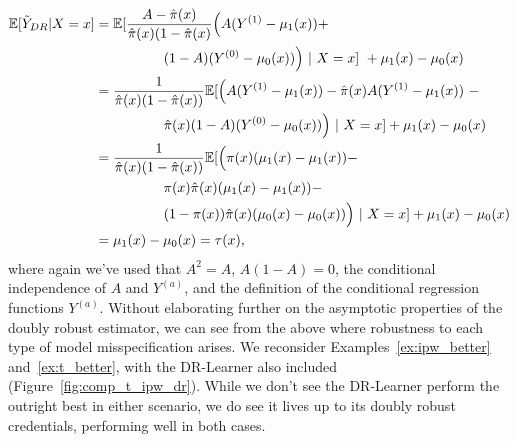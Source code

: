 \documentclass[../thesis.tex]{subfiles}
\begin{document}
\begin{align*}
    \bbE[\Tilde{Y}_{DR} | X = x] & = \bbE [\frac{A - \pihat(x)}{\pihat(x)(1 - \pihat(x)} \Big( A (Y^{(1)} - \mu_1(x)) + \\
    &\hspace{50pt} (1-A)(Y^{(0)} - \mu_0(x)) \Big) \ | \ X=x] \ +  \mu_1(x) - \mu_0(x)  \\
    & = \frac{1}{\pihat(x)(1-\pihat(x))} \bbE [ \Big( A(Y^{(1)} - \mu_1(x)) -\pihat(x)A(Y^{(1)} - \mu_1(x)) \ - \\
    & \hspace{50pt} \pihat(x) (1-A)(Y^{(0)} - \mu_0(x))\Big) \ | \ X=x] + \mu_1(x) - \mu_0(x) \\
    & = \frac{1}{\pihat(x)(1-\pihat(x))} \bbE [\Big( \pi(x) (\mu_1(x) - \mu_1(x)) - \\
    & \hspace{50pt} \pi(x)\pihat(x)(\mu_1(x) - \mu_1(x)) - \\
    & \hspace{50pt} (1-\pi(x))\pihat(x)(\mu_0(x) - \mu_0(x)) \Big) \ | \ X=x ] + \mu_1(x) - \mu_0(x) \\
    & = \mu_1(x) - \mu_0(x) = \tau(x),
\end{align*}
where again we've used that $A^2 = A$, $A(1-A) = 0$, the conditional independence of $A$ and $Y^{(a)}$, and the definition of the conditional regression functions $Y^{(a)}$.
Without elaborating further on the asymptotic properties of the doubly robust estimator, we can see from the above where robustness to each type of model misspecification arises. We reconsider Examples~\ref{ex:ipw_better} and~\ref{ex:t_better}, with the DR-Learner also included (Figure~\ref{fig:comp_t_ipw_dr}). While we don't see the DR-Learner perform the outright best in either scenario, we do see it lives up to its doubly robust credentials, performing well in both cases.
\end{document}
